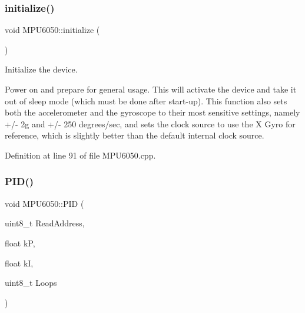 \subsubsection{\texorpdfstring{initialize()}{initialize()}}
{\footnotesize\ttfamily void M\+P\+U6050\+::initialize (\begin{DoxyParamCaption}{ }\end{DoxyParamCaption})}

Initialize the device.

Power on and prepare for general usage. This will activate the device and take it out of sleep mode (which must be done after start-\/up). This function also sets both the accelerometer and the gyroscope to their most sensitive settings, namely +/-\/ 2g and +/-\/ 250 degrees/sec, and sets the clock source to use the X Gyro for reference, which is slightly better than the default internal clock source. 

Definition at line 91 of file M\+P\+U6050.\+cpp.


\begin{DoxyCode}{0}

\end{DoxyCode}
\mbox{\label{classMPU6050_aa0805d780a0f9ee25101db72f8e3e1b5}} 
\subsubsection{\texorpdfstring{PID()}{PID()}}
{\footnotesize\ttfamily void M\+P\+U6050\+::\+P\+ID (\begin{DoxyParamCaption}\item[{uint8\+\_\+t}]{Read\+Address,  }\item[{float}]{kP,  }\item[{float}]{kI,  }\item[{uint8\+\_\+t}]{Loops }\end{DoxyParamCaption})}


